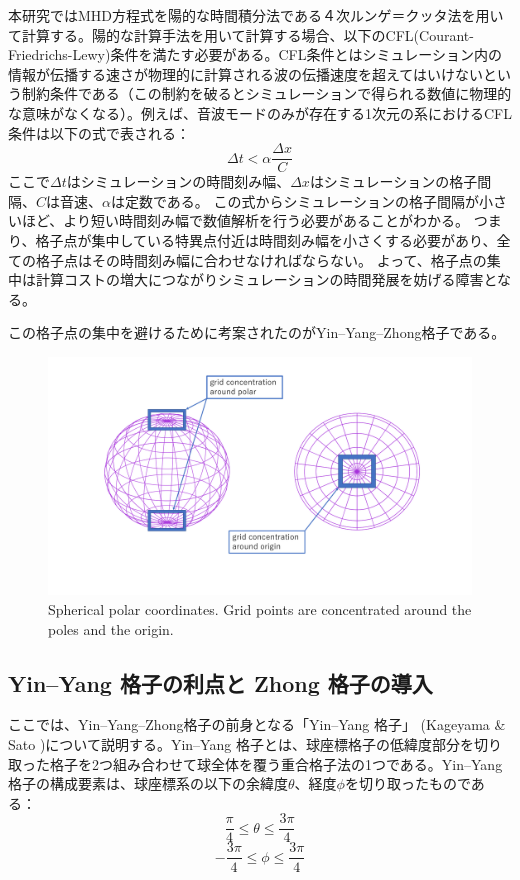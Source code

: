 \documentclass[12pt]{jsarticle}
\begin{document}
本研究ではMHD方程式を陽的な時間積分法である４次ルンゲ＝クッタ法を用いて計算する。陽的な計算手法を用いて計算する場合、以下のCFL(Courant-Friedrichs-Lewy)条件を満たす必要がある。CFL条件とはシミュレーション内の情報が伝播する速さが物理的に計算される波の伝播速度を超えてはいけないという制約条件である（この制約を破るとシミュレーションで得られる数値に物理的な意味がなくなる）。例えば、音波モードのみが存在する1次元の系におけるCFL条件は以下の式で表される：
\begin{equation}
\Delta t < \alpha\frac{\Delta x}{C} 
\end{equation}
ここで$\Delta t$はシミュレーションの時間刻み幅、$\Delta x$はシミュレーションの格子間隔、$C$は音速、$\alpha$は定数である。
この式からシミュレーションの格子間隔が小さいほど、より短い時間刻み幅で数値解析を行う必要があることがわかる。
つまり、格子点が集中している特異点付近は時間刻み幅を小さくする必要があり、全ての格子点はその時間刻み幅に合わせなければならない。
よって、格子点の集中は計算コストの増大につながりシミュレーションの時間発展を妨げる障害となる。

この格子点の集中を避けるために考案されたのがYin--Yang--Zhong格子である\cite{hayashi2016yin}。

\begin{figure}[H]
\centering
\includegraphics[height=0.5\textheight,width=1.0\hsize,angle=0,keepaspectratio]{./Image/grid.png}
\caption{Spherical polar coordinates. Grid points are concentrated around the poles and the origin.} \label{fig:grid}
\end{figure}



\subsection{Yin--Yang 格子の利点と Zhong 格子の導入}
ここでは、Yin--Yang--Zhong格子の前身となる「Yin--Yang 格子」 (Kageyama \& Sato \cite{kageyama2004yin})について説明する。Yin--Yang 格子とは、球座標格子の低緯度部分を切り取った格子を2つ組み合わせて球全体を覆う重合格子法の1つである。Yin--Yang 格子の構成要素は、球座標系の以下の余緯度$\theta$、経度$\phi$を切り取ったものである：
\begin{equation}
\frac{\pi}{4} \leq \theta \leq \frac{3\pi}{4}
\end{equation}
\begin{equation}
-\frac{3\pi}{4} \leq \phi \leq \frac{3\pi}{4}
\end{equation}
\end{document}
